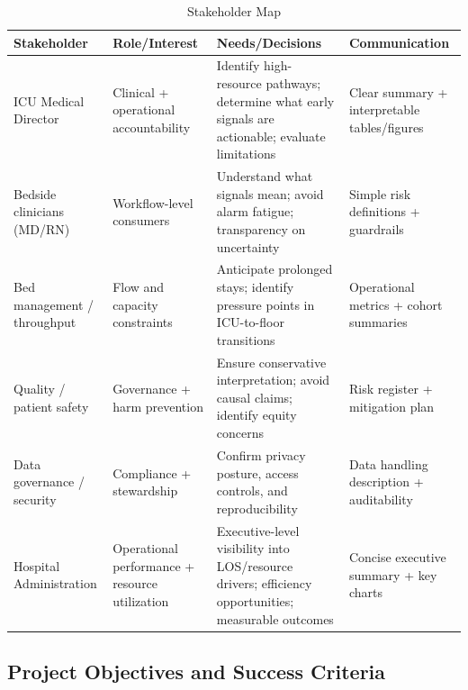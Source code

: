 \documentclass[12pt]{article}
\begin{document}
\begin{table}[H]
\centering
\small
\setlength{\tabcolsep}{4pt}
\renewcommand{\arraystretch}{1.15} 
\caption{Stakeholder Map}
\begin{tabularx}{\textwidth}{
>{\raggedright\arraybackslash}p{3.0cm}
>{\raggedright\arraybackslash}X
>{\raggedright\arraybackslash}X
>{\raggedright\arraybackslash}p{3.5cm}
}
\toprule
\textbf{Stakeholder} & \textbf{Role/Interest} & \textbf{Needs/Decisions} & \textbf{Communication} \\
\midrule
ICU Medical Director & Clinical + operational accountability &
Identify high-resource pathways; determine what early signals are actionable; evaluate limitations &
Clear summary + interpretable tables/figures \\
Bedside clinicians (MD/RN) & Workflow-level consumers &
Understand what signals mean; avoid alarm fatigue; transparency on uncertainty &
Simple risk definitions + guardrails \\
Bed management / throughput & Flow and capacity constraints &
Anticipate prolonged stays; identify pressure points in ICU-to-floor transitions &
Operational metrics + cohort summaries \\
Quality / patient safety & Governance + harm prevention &
Ensure conservative interpretation; avoid causal claims; identify equity concerns &
Risk register + mitigation plan \\
Data governance / security & Compliance + stewardship &
Confirm privacy posture, access controls, and reproducibility &
Data handling description + auditability \\
Hospital Administration & Operational performance + resource utilization &
Executive-level visibility into LOS/resource drivers; efficiency opportunities; measurable outcomes &
Concise executive summary + key charts \\
\bottomrule
\end{tabularx}
\end{table}

\subsection{Project Objectives and Success Criteria}
\label{subsec:objectives}

%
%
\end{document}
